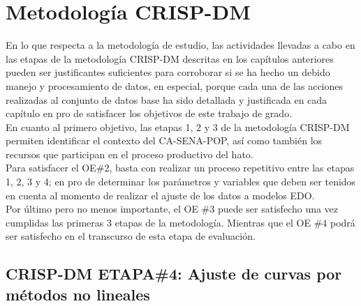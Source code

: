 
\section{Metodología CRISP-DM}

En lo que respecta a la metodología de estudio, las actividades llevadas a cabo en las etapas de la metodología CRISP-DM descritas en los capítulos anteriores pueden ser justificantes suficientes para corroborar si se ha hecho un debido manejo y procesamiento de datos, en especial, porque cada una de las acciones realizadas al conjunto de datos base ha sido detallada y justificada en cada capítulo en pro de satisfacer los objetivos de este trabajo de grado.\\

En cuanto al primero objetivo, las etapas 1, 2 y 3 de la metodología CRISP-DM permiten identificar el contexto del CA-SENA-POP, así como también los recursos que participan en el proceso productivo del hato.\\

Para satisfacer el OE\#2, basta con realizar un proceso repetitivo entre las etapas 1, 2, 3 y 4; en pro de determinar los parámetros y variables que deben ser tenidos en cuenta al momento de realizar el ajuste de los datos a modelos EDO.\\

Por último pero no menos importante, el OE \#3 puede ser satisfecho una vez cumplidas las primeras 3 etapas de la metodología. Mientras que el OE \#4 podrá ser satisfecho en el transcurso de esta etapa de evaluación.


\subsection{CRISP-DM ETAPA\#4: Ajuste de curvas por métodos no lineales}

